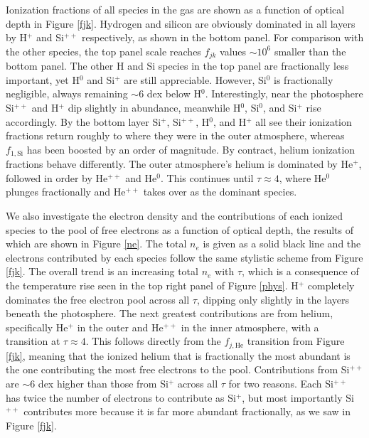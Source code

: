 \documentclass[iop,revtex4]{emulateapj}
\begin{document}
\par
Ionization fractions of all species in the gas are shown as a function of optical depth in Figure \ref{fjk}. Hydrogen and silicon are obviously dominated in all layers by H$^{+}$ and Si$^{++}$ respectively, as shown in the bottom panel. For comparison with the other species, the top panel scale reaches $f_{jk}$ values $\sim10^{6}$ smaller than the bottom panel. The other H and Si species in the top panel are fractionally less important, yet H$^{0}$ and Si$^{+}$ are still appreciable. However, Si$^{0}$ is fractionally negligible, always remaining $\sim6$ dex below H$^{0}$. Interestingly, near the photosphere Si$^{++}$ and H$^{+}$ dip slightly in abundance, meanwhile H$^{0}$, Si$^{0}$, and Si$^{+}$ rise accordingly. By the bottom layer Si$^{+}$, Si$^{++}$, H$^{0}$, and H$^{+}$ all see their ionization fractions return roughly to where they were in the outer atmosphere, whereas $f_{1,\text{Si}}$ has been boosted by an order of magnitude. By contract, helium ionization fractions behave differently. The outer atmosphere's helium is dominated by He$^{+}$, followed in order by He$^{++}$ and He$^{0}$. This continues until $\tau\approx4$, where He$^{0}$ plunges fractionally and He$^{++}$ takes over as the dominant species. 
\par
We also investigate the electron density and the contributions of each ionized species to the pool of free electrons as a function of optical depth, the results of which are shown in Figure \ref{ne}. The total $n_{e}$ is given as a solid black line and the electrons contributed by each species follow the same stylistic scheme from Figure \ref{fjk}. The overall trend is an increasing total $n_{e}$ with $\tau$, which is a consequence of the temperature rise seen in the top right panel of Figure \ref{phys}. H$^{+}$ completely dominates the free electron pool across all $\tau$, dipping only slightly in the layers beneath the photosphere. The next greatest contributions are from helium, specifically He$^{+}$ in the outer and He$^{++}$ in the inner atmosphere, with a transition at $\tau\approx4$. This follows directly from the $f_{j,\text{He}}$ transition from Figure \ref{fjk}, meaning that the ionized helium that is fractionally the most abundant is the one contributing the most free electrons to the pool. Contributions from Si$^{++}$ are $\sim6$ dex higher than those from Si$^{+}$ across all $\tau$ for two reasons. Each Si$^{++}$ has twice the number of electrons to contribute as Si$^{+}$, but most importantly Si$^{++}$ contributes more because it is far more abundant fractionally, as we saw in Figure \ref{fjk}.
\end{document}
